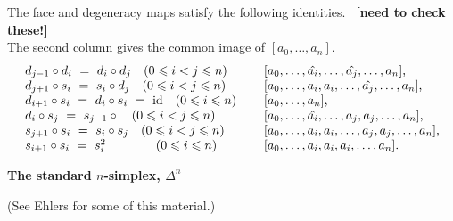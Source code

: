 \noindent
The face and degeneracy maps satisfy the following identities.
~{\bf [need to check these!]}  \\
The second column gives the common image of $[a_0,\ldots,a_n]$.
\begin{equation} \label{eq:face-degen} 
\begin{tabular}{ll}
$d_{j-1} \circ d_i ~=~ d_i \circ d_j\quad (0 \leqslant i < j \leqslant n)$ 
  & $\quad[a_0,\ldots,\hat{a_i},\ldots,\hat{a_j},\ldots,a_n]$, \\
$d_{j+1} \circ s_i ~=~ s_i \circ d_j\quad (0 \leqslant i < j \leqslant n)$ 
  & $\quad[a_0,\ldots,a_i,a_i,\ldots,\hat{a_j},\ldots,a_n]$, \\
$d_{i+1} \circ s_i ~=~ d_i \circ s_i ~=~ \id
\quad (0 \leqslant i \leqslant n)$ 
  & $\quad[a_0,\ldots,a_n]$, \\
$d_i \circ s_j ~=~ s_{j-1} \circ \quad (0 \leqslant i < j \leqslant n)$ 
  & $\quad[a_0,\ldots,\hat{a_i},\ldots,a_j,a_j,\ldots,a_n]$, \\
$s_{j+1} \circ s_i ~=~ s_i \circ s_j\quad (0 \leqslant i < j \leqslant n)$ 
  & $\quad[a_0,\ldots,a_i,a_i,\ldots,a_j,a_j,\ldots,a_n]$, \\
$s_{i+1} \circ s_i ~=~ s_i^2 \qquad\qquad (0 \leqslant i \leqslant n)$ 
  & $\quad[a_0,\ldots,a_i,a_i,a_i,\ldots,a_n]$. \\
\end{tabular}
\end{equation}

\bigskip\noindent
{\bf The standard $n$-simplex, $\Delta^n$} 

\medskip\noindent
(See Ehlers \cite{ehlers} for some of this material.)

